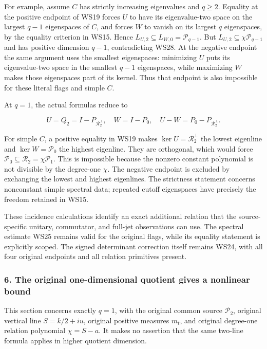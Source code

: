 For example, assume \(C\) has strictly increasing eigenvalues and \(q\ge2\). Equality at the positive endpoint of WS19 forces \(U\) to have its eigenvalue-two space on the largest \(q-1\) eigenspaces of \(C\), and forces \(W\) to vanish on its largest \(q\) eigenspaces, by the equality criterion in WS15. Hence \(L_{U,2}\subseteq L_{W,0}=\mathcal P_{q-1}\). But \(L_{U,2}\subseteq\chi\mathcal P_{q-1}\) and has positive dimension \(q-1\), contradicting WS28. At the negative endpoint the same argument uses the smallest eigenspaces: minimizing \(U\) puts its eigenvalue-two space in the smallest \(q-1\) eigenspaces, while maximizing \(W\) makes those eigenspaces part of its kernel. Thus that endpoint is also impossible for these literal flags and simple \(C\).

At \(q=1\), the actual formulas reduce to

\[
U=Q_2=I-P_{\mathcal R_2^\perp},
\quad W=I-P_0,
\quad U-W=P_0-P_{\mathcal R_2^\perp}.
\tag{WS29}
\]

For simple \(C\), a positive equality in WS19 makes \(\ker U=\mathcal R_2^\perp\) the lowest eigenline and \(\ker W=\mathcal P_0\) the highest eigenline. They are orthogonal, which would force \(\mathcal P_0\subseteq\mathcal R_2=\chi\mathcal P_1\). This is impossible because the nonzero constant polynomial is not divisible by the degree-one \(\chi\). The negative endpoint is excluded by exchanging the lowest and highest eigenlines. The strictness statement concerns nonconstant simple spectral data; repeated cutoff eigenspaces have precisely the freedom retained in WS15.

These incidence calculations identify an exact additional relation that the source-specific unitary, commutator, and full-jet observations can use. The spectral estimate WS25 remains valid for the original flags, while its equality statement is explicitly scoped. The signed determinant correction itself remains WS24, with all four original endpoints and all relation primitives present.

\subsubsection{6. The original one-dimensional quotient gives a nonlinear bound}\label{endpoint-window_review--the-original-one-dimensional-quotient-gives-a-nonlinear-bound}

This section concerns exactly \(q=1\), with the original common source \(\mathcal P_2\), original vertical line \(S=k/2+iu\), original positive measures \(m_t\), and original degree-one relation polynomial \(\chi=S-a\). It makes no assertion that the same two-line formula applies in higher quotient dimension.

